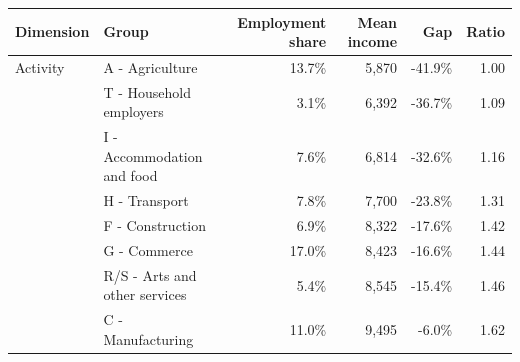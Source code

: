 \begin{tabular}{lp{}rrrr}
\toprule
    Dimension & Group & Employment share & Mean income & Gap & Ratio \\
    \midrule

    Activity & A - Agriculture & 13.7\% & 5,870 & -41.9\% & 1.00 \\
& T - Household employers & 3.1\% & 6,392 & -36.7\% & 1.09 \\
& I - Accommodation and food & 7.6\% & 6,814 & -32.6\% & 1.16 \\
& H - Transport & 7.8\% & 7,700 & -23.8\% & 1.31 \\
& F - Construction & 6.9\% & 8,322 & -17.6\% & 1.42 \\
& G - Commerce & 17.0\% & 8,423 & -16.6\% & 1.44 \\
& R/S - Arts and other services & 5.4\% & 8,545 & -15.4\% & 1.46 \\
& C - Manufacturing & 11.0\% & 9,495 & -6.0\% & 1.62\\
\bottomrule\end{tabular}
